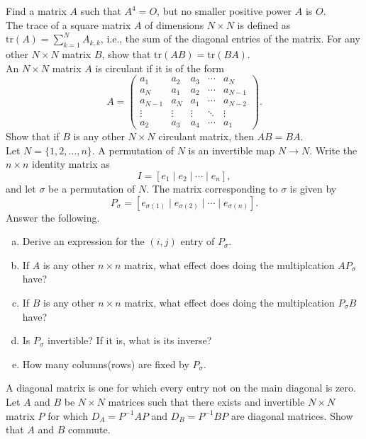 \documentclass[a4paper,11pt]{article}
\begin{document}
 Find a matrix $A$ such that $A^4=O$, but no
smaller positive power $A$ is $O$. \\

 The trace of a square matrix $A$ of dimensions
$N \times N$ is defined as $\text{tr}(A)=\sum_{k=1}^NA_{k,k}$, i.e., the sum of
the diagonal entries of the matrix. For any other $N \times N$ matrix $B$, show
that $\text{tr}(AB)=\text{tr}(BA)$. \\

 An $N \times N$ matrix $A$ is circulant if it is
of the form
\[
  A=\begin{pmatrix}
      a_1 & a_2 & a_3 & \cdots & a_N \\
      a_N & a_1 & a_2 & \cdots & a_{N-1} \\
      a_{N-1} & a_N & a_1 & \cdots & a_{N-2} \\
      \vdots & \vdots & \vdots & \ddots & \vdots \\
      a_2 & a_3 & a_4 & \cdots & a_1
    \end{pmatrix}.
\]
Show that if $B$ is any other $N \times N$ circulant matrix, then $AB=BA$. \\

 Let $N=\{1,2,\dots,n\}$. A permutation of $N$
is an invertible map $N \rightarrow N$. Write the $n \times n$ identity matrix
as
\[
  I=[e_1 \mid e_2 \mid \cdots \mid e_n],
\]
and let $\sigma$ be a permutation of $N$. The matrix corresponding to $\sigma$
is given by
\[
  P_\sigma = [e_{\sigma(1)} \mid e_{\sigma(2)} \mid \cdots \mid e_{\sigma(n)}].
\]
Answer the following.
\begin{enumerate}[(a)]
\item Derive an expression for the $(i,j)$ entry of $P_\sigma$.
\item If $A$ is any other $n \times n$ matrix, what effect does doing the
multiplcation $AP_\sigma$ have?
\item If $B$ is any other $n \times n$ matrix, what effect does doing the
multiplcation $P_\sigma B$ have?
\item Is $P_\sigma$ invertible? If it is, what is its inverse?
\item How many columns(rows) are fixed by $P_\sigma$. \\
\end{enumerate}

 A diagonal matrix is one for which every entry
not on the main diagonal is zero. Let $A$ and $B$ be $N \times N$ matrices such
that there exists and invertible $N \times N$ matrix $P$ for which
$D_A=P^{-1}AP$ and $D_B=P^{-1}BP$ are diagonal matrices. Show that $A$ and $B$
commute.
\end{document}
